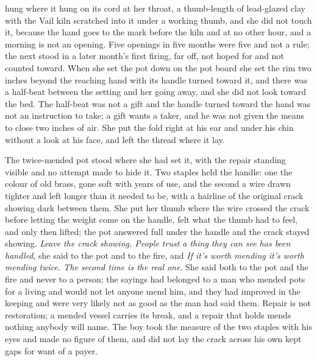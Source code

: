  hung where it hung on its cord at her throat, a thumb-length of lead-glazed clay with the Vail kiln scratched into it under a working thumb, and she did not touch it, because the hand goes to the mark before the kiln and at no other hour, and a morning is not an opening. Five openings in five months were five and not a rule; the next stood in a later month's first firing, far off, not hoped for and not counted toward. When she set the pot down on the pot board she set the rim two inches beyond the reaching hand with its handle turned toward it, and there was a half-beat between the setting and her going away, and she did not look toward the bed. The half-beat was not a gift and the handle turned toward the hand was not an instruction to take; a gift wants a taker, and he was not given the means to close two inches of air. She put the fold right at his ear and under his chin without a look at his face, and left the thread where it lay.

The twice-mended pot stood where she had set it, with the repair standing visible and no attempt made to hide it. Two staples held the handle: one the colour of old brass, gone soft with years of use, and the second a wire drawn tighter and left longer than it needed to be, with a hairline of the original crack showing dark between them. She put her thumb where the wire crossed the crack before letting the weight come on the handle, felt what the thumb had to feel, and only then lifted; the pot answered full under the handle and the crack stayed showing. \emph{Leave the crack showing. People trust a thing they can see has been handled}, she said to the pot and to the fire, and \emph{If it's worth mending it's worth mending twice. The second time is the real one}. She said both to the pot and the fire and never to a person; the sayings had belonged to a man who mended pots for a living and would not let anyone mend him, and they had improved in the keeping and were very likely not as good as the man had said them. Repair is not restoration; a mended vessel carries its break, and a repair that holds mends nothing anybody will name. The boy took the measure of the two staples with his eyes and made no figure of them, and did not lay the crack across his own kept gaps for want of a payer.

\scenebreak


